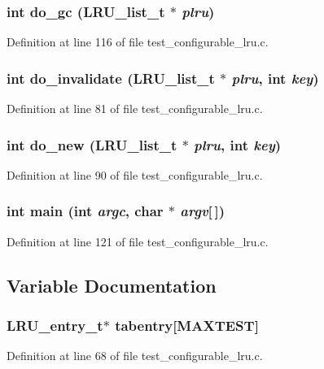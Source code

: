 \subsubsection[{do\_\-gc}]{\setlength{\rightskip}{0pt plus 5cm}int do\_\-gc (LRU\_\-list\_\-t $\ast$ {\em plru})}\label{test__configurable__lru_8c_a69fb1ec85a72456d2eaa23d63156d54d}


Definition at line 116 of file test\_\-configurable\_\-lru.c.
\subsubsection[{do\_\-invalidate}]{\setlength{\rightskip}{0pt plus 5cm}int do\_\-invalidate (LRU\_\-list\_\-t $\ast$ {\em plru}, \/  int {\em key})}\label{test__configurable__lru_8c_a8e17dac3023565c5bd97b43488ab7f3d}


Definition at line 81 of file test\_\-configurable\_\-lru.c.
\subsubsection[{do\_\-new}]{\setlength{\rightskip}{0pt plus 5cm}int do\_\-new (LRU\_\-list\_\-t $\ast$ {\em plru}, \/  int {\em key})}\label{test__configurable__lru_8c_a95d0189529916fad0da728ba589c3b4c}


Definition at line 90 of file test\_\-configurable\_\-lru.c.
\subsubsection[{main}]{\setlength{\rightskip}{0pt plus 5cm}int main (int {\em argc}, \/  char $\ast$ {\em argv}[$\,$])}\label{test__configurable__lru_8c_a0ddf1224851353fc92bfbff6f499fa97}


Definition at line 121 of file test\_\-configurable\_\-lru.c.

\subsection{Variable Documentation}
\subsubsection[{tabentry}]{\setlength{\rightskip}{0pt plus 5cm}LRU\_\-entry\_\-t$\ast$ {\bf tabentry}[MAXTEST]}\label{test__configurable__lru_8c_a4708db27e214130ba35e65dd4b740156}


Definition at line 68 of file test\_\-configurable\_\-lru.c.